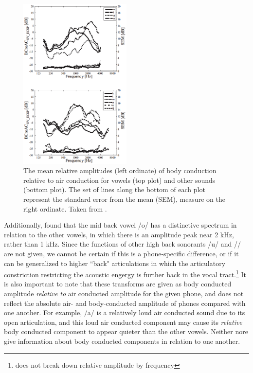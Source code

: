\documentclass[dissertation,copyright]{uathesis}
\begin{document}
\begin{figure}
\includegraphics[width=0.5\textwidth]{figure/BC_rel_AC_all.png}
\caption{The mean relative amplitudes (left ordinate) of body conduction relative to air conduction for vowels (top plot) and other sounds (bottom plot).  The set of lines along the bottom of each plot represent the standard error from the mean (SEM), measure on the right ordinate.  Taken from \cite{reinfeldt:10}.}
\label{BCrelACall}
\end{figure}


Additionally, \cite{reinfeldt:10} found that the mid back vowel /o/ has a distinctive spectrum in relation to the other vowels, in which there is an amplitude peak near 2 kHz, rather than 1 kHz.  Since the functions of other high back sonorants /u/ and // are not given, we cannot be certain if this is a phone-specific difference, or if it can be generalized to higher ``back" articulations in which the articulatory constriction restricting the acoustic engergy is further back in the vocal tract.\footnote{\cite{bekesy:60} does not break down relative amplitude by frequency}  It is also important to note that these transforms are given as body conducted amplitude \textit{relative to} air conducted amplitude for the given phone, and does not reflect the absolute air- and body-conducted amplitude of phones compared with one another.  For example, /a/ is a relatively loud air conducted sound due to its open articulation, and this loud air conducted component may cause its \textit{relative} body conducted component to appear quieter than the other vowels.  Neither \cite{bekesy:60} nore \cite{reinfeldt:10} give information about body conducted components in relation to one another.
\end{document}
